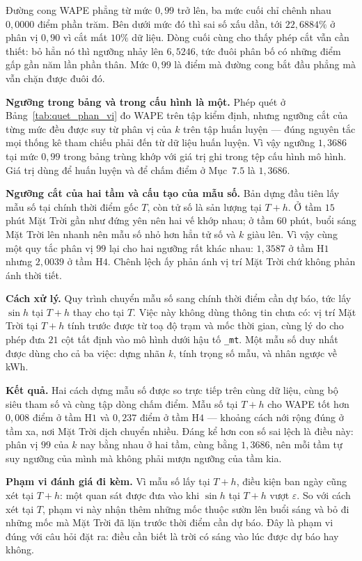 Đường cong WAPE phẳng từ mức $0{,}99$ trở lên, ba mức cuối chỉ chênh nhau $0{,}0000$ điểm
phần trăm. Bên dưới mức đó thì sai số xấu dần, tới $22{,}6884\%$ ở phân vị $0{,}90$ vì cắt mất
$10\%$ dữ liệu. Dòng cuối cùng cho thấy phép cắt vẫn cần thiết: bỏ hẳn nó thì ngưỡng nhảy
lên $6{,}5246$, tức đuôi phân bố có những điểm gấp gần năm lần phần thân. Mức $0{,}99$ là
điểm mà đường cong bắt đầu phẳng mà vẫn chặn được đuôi đó.

\textbf{Ngưỡng trong bảng và trong cấu hình là một.} Phép quét ở Bảng~\ref{tab:quet_phan_vi}
đo WAPE trên tập kiểm định, nhưng ngưỡng cắt của từng mức đều được suy từ phân vị của $k$
trên tập huấn luyện --- đúng nguyên tắc mọi thống kê tham chiếu phải đến từ dữ liệu huấn
luyện. Vì vậy ngưỡng $1{,}3686$ tại mức $0{,}99$ trong bảng trùng khớp với giá trị ghi trong
tệp cấu hình mô hình. Giá trị dùng để huấn luyện và để chấm điểm ở Mục~$7.5$ là $1{,}3686$.

\textbf{Ngưỡng cắt của hai tầm và cấu tạo của mẫu số.} Bản dựng đầu tiên lấy mẫu số tại
chính thời điểm gốc $T$, còn tử số là sản lượng tại $T+h$. Ở tầm $15$ phút Mặt Trời gần như
đứng yên nên hai vế khớp nhau; ở tầm $60$ phút, buổi sáng Mặt Trời lên nhanh nên mẫu số nhỏ
hơn hẳn tử số và $k$ giàu lên. Vì vậy cùng một quy tắc phân vị $99$ lại cho hai ngưỡng rất
khác nhau: $1{,}3587$ ở tầm H$1$ nhưng $2{,}0039$ ở tầm H$4$. Chênh lệch ấy phản ánh vị trí
Mặt Trời chứ không phản ánh thời tiết.

\textbf{Cách xử lý.} Quy trình chuyển mẫu số sang chính thời điểm cần dự báo, tức lấy
$\sin h$ tại $T+h$ thay cho tại $T$. Việc này không dùng thông tin chưa có: vị trí Mặt Trời
tại $T+h$ tính trước được từ toạ độ trạm và mốc thời gian, cùng lý do cho phép đưa $21$ cột
tất định vào mô hình dưới hậu tố \texttt{\_mt}. Một mẫu số duy nhất được dùng cho cả ba việc:
dựng nhãn $k$, tính trọng số mẫu, và nhân ngược về kWh.

\textbf{Kết quả.} Hai cách dựng mẫu số được so trực tiếp trên cùng dữ liệu, cùng bộ siêu tham
số và cùng tập dòng chấm điểm. Mẫu số tại $T+h$ cho WAPE tốt hơn $0{,}008$ điểm ở tầm H$1$ và
$0{,}237$ điểm ở tầm H$4$ --- khoảng cách nới rộng đúng ở tầm xa, nơi Mặt Trời dịch chuyển
nhiều. Đáng kể hơn con số sai lệch là điều này: phân vị $99$ của $k$ nay bằng nhau ở hai tầm,
cùng bằng $1{,}3686$, nên mỗi tầm tự suy ngưỡng của mình mà không phải mượn ngưỡng của tầm kia.

\textbf{Phạm vi đánh giá đi kèm.} Vì mẫu số lấy tại $T+h$, điều kiện ban ngày cũng xét tại
$T+h$: một quan sát được đưa vào khi $\sin h$ tại $T+h$ vượt $\varepsilon$. So với cách xét
tại $T$, phạm vi này nhận thêm những mốc thuộc sườn lên buổi sáng và bỏ đi những mốc mà Mặt
Trời đã lặn trước thời điểm cần dự báo. Đây là phạm vi đúng với câu hỏi đặt ra: điều cần biết
là trời có sáng vào lúc được dự báo hay không.

